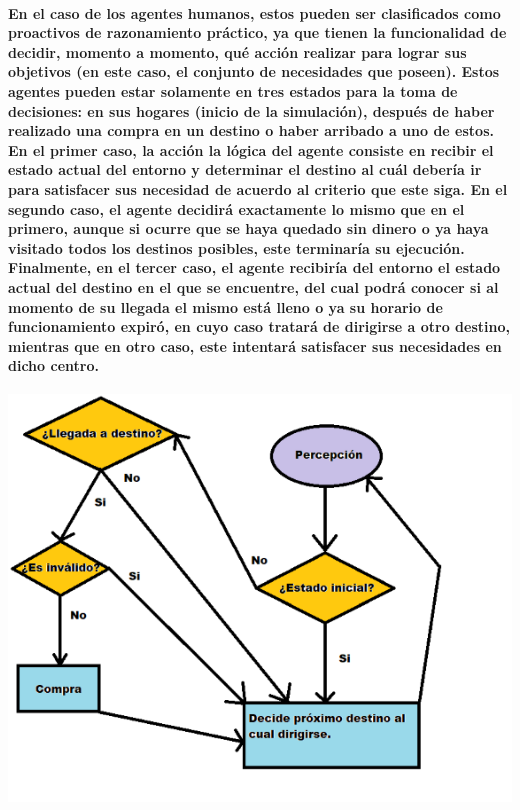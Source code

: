 \documentclass[12pt]{amsart}
\begin{document}
\paragraph{En el caso de los agentes humanos, estos pueden ser clasificados como proactivos de razonamiento práctico, ya que tienen la funcionalidad de decidir, momento a momento, qué acción realizar para lograr sus objetivos (en este caso, el conjunto de necesidades que poseen).  Estos agentes pueden estar solamente en tres estados para la toma de decisiones: en sus hogares (inicio de la simulación), después de haber realizado una compra en un destino o haber arribado a uno de estos. En el primer caso, la acción la lógica del agente consiste en recibir el estado actual del entorno y determinar el destino al cuál debería ir para satisfacer sus necesidad de acuerdo al criterio que este siga. En el segundo caso, el agente decidirá exactamente lo mismo que en el primero, aunque si ocurre que se haya quedado sin dinero o ya haya visitado todos los  destinos posibles, este terminaría su ejecución. Finalmente, en el tercer caso, el agente recibiría del entorno el estado actual del destino en el que se encuentre, del cual podrá conocer si al momento de su llegada el mismo está lleno o ya su horario de funcionamiento expiró, en cuyo caso tratará de dirigirse a otro destino, mientras que en otro caso, este intentará satisfacer sus necesidades en dicho centro.}

\begin{center}
	\includegraphics[scale=0.8]{./images/humanalgo.png}
	\label{fig:humanalgo}
\end{center}
\end{document}
